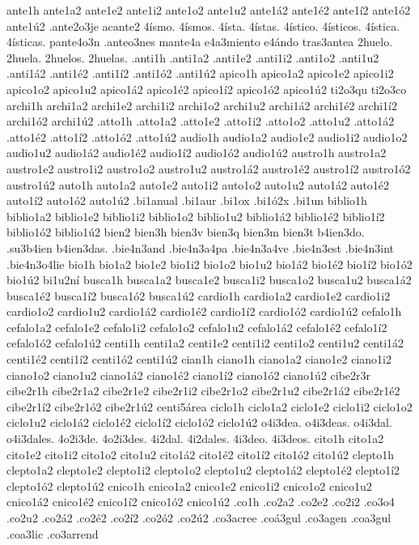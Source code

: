 {ante1h
ante1a2 ante1e2 ante1i2 ante1o2 ante1u2
ante1á2 ante1é2 ante1í2 ante1ó2 ante1ú2
.ante2o3je
acante2
4ísmo.
4ísmos.
4ísta.
4ístas.
4ístico.
4ísticos.
4ística.
4ísticas.
pante4o3n
.anteo3nes
mante4a
e4a3miento
e4ándo
tras3antea
2huelo.
2huela.
2huelos.
2huelas.
.anti1h
.anti1a2 .anti1e2 .anti1i2 .anti1o2 .anti1u2
.anti1á2 .anti1é2 .anti1í2 .anti1ó2 .anti1ú2
apico1h
apico1a2 apico1e2 apico1i2 apico1o2 apico1u2
apico1á2 apico1é2 apico1í2 apico1ó2 apico1ú2
ti2o3qu
ti2o3co
archi1h
archi1a2 archi1e2 archi1i2 archi1o2 archi1u2
archi1á2 archi1é2 archi1í2 archi1ó2 archi1ú2
.atto1h
.atto1a2 .atto1e2 .atto1i2 .atto1o2 .atto1u2
.atto1á2 .atto1é2 .atto1í2 .atto1ó2 .atto1ú2
audio1h
audio1a2 audio1e2 audio1i2 audio1o2 audio1u2
audio1á2 audio1é2 audio1í2 audio1ó2 audio1ú2
austro1h
austro1a2 austro1e2 austro1i2 austro1o2 austro1u2
austro1á2 austro1é2 austro1í2 austro1ó2 austro1ú2
auto1h
auto1a2 auto1e2 auto1i2 auto1o2 auto1u2
auto1á2 auto1é2 auto1í2 auto1ó2 auto1ú2
.bi1anual
.bi1aur
.bi1ox
.bi1ó2x
.bi1un
biblio1h
biblio1a2 biblio1e2 biblio1i2 biblio1o2 biblio1u2
biblio1á2 biblio1é2 biblio1í2 biblio1ó2 biblio1ú2
bien2
bien3h
bien3v
bien3q
bien3m
bien3t
b4ien3do.
.su3b4ien
b4ien3das.
.bie4n3and
.bie4n3a4pa
.bie4n3a4ve
.bie4n3est
.bie4n3int
.bie4n3o4lie
bio1h
bio1a2 bio1e2 bio1i2 bio1o2 bio1u2
bio1á2 bio1é2 bio1í2 bio1ó2 bio1ú2
bi1u2ní
busca1h
busca1a2 busca1e2 busca1i2 busca1o2 busca1u2
busca1á2 busca1é2 busca1í2 busca1ó2 busca1ú2
cardio1h
cardio1a2 cardio1e2 cardio1i2 cardio1o2 cardio1u2
cardio1á2 cardio1é2 cardio1í2 cardio1ó2 cardio1ú2
cefalo1h
cefalo1a2 cefalo1e2 cefalo1i2 cefalo1o2 cefalo1u2
cefalo1á2 cefalo1é2 cefalo1í2 cefalo1ó2 cefalo1ú2
centi1h
centi1a2 centi1e2 centi1i2 centi1o2 centi1u2
centi1á2 centi1é2 centi1í2 centi1ó2 centi1ú2
cian1h
ciano1h
ciano1a2 ciano1e2 ciano1i2 ciano1o2 ciano1u2
ciano1á2 ciano1é2 ciano1í2 ciano1ó2 ciano1ú2
cibe2r3r
cibe2r1h
cibe2r1a2 cibe2r1e2 cibe2r1i2 cibe2r1o2 cibe2r1u2
cibe2r1á2 cibe2r1é2 cibe2r1í2 cibe2r1ó2 cibe2r1ú2
centi5área
ciclo1h
ciclo1a2 ciclo1e2 ciclo1i2 ciclo1o2 ciclo1u2
ciclo1á2 ciclo1é2 ciclo1í2 ciclo1ó2 ciclo1ú2
o4i3dea.
o4i3deas.
o4i3dal.
o4i3dales.
4o2i3de.
4o2i3des.
4i2dal.
4i2dales.
4i3deo.
4i3deos.
cito1h
cito1a2 cito1e2 cito1i2 cito1o2 cito1u2
cito1á2 cito1é2 cito1í2 cito1ó2 cito1ú2
clepto1h
clepto1a2 clepto1e2 clepto1i2 clepto1o2 clepto1u2
clepto1á2 clepto1é2 clepto1í2 clepto1ó2 clepto1ú2
cnico1h
cnico1a2 cnico1e2 cnico1i2 cnico1o2 cnico1u2
cnico1á2 cnico1é2 cnico1í2 cnico1ó2 cnico1ú2
.co1h
.co2a2
.co2e2
.co2i2
.co3o4
.co2u2
.co2á2
.co2é2
.co2í2
.co2ó2
.co2ú2
.co3acree
.coá3gul
.co3agen
.coa3gul
.coa3lic
.co3arrend
}
